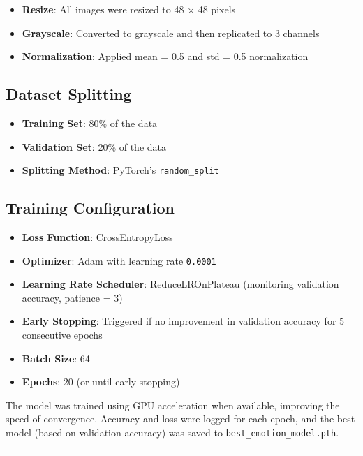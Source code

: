 \documentclass[
  letterpaper,
  DIV=11,
  numbers=noendperiod]{scrreport}
\providecommand{\tightlist}{%
  \setlength{\itemsep}{0pt}\setlength{\parskip}{0pt}}
\begin{document}
\begin{itemize}
\tightlist
\item
  \textbf{Resize}: All images were resized to 48 × 48 pixels
\item
  \textbf{Grayscale}: Converted to grayscale and then replicated to 3
  channels
\item
  \textbf{Normalization}: Applied mean = 0.5 and std = 0.5 normalization
\end{itemize}

\subsection{Dataset Splitting}\label{dataset-splitting}

\begin{itemize}
\tightlist
\item
  \textbf{Training Set}: 80\% of the data
\item
  \textbf{Validation Set}: 20\% of the data
\item
  \textbf{Splitting Method}: PyTorch's \texttt{random\_split}
\end{itemize}

\subsection{Training Configuration}\label{training-configuration}

\begin{itemize}
\tightlist
\item
  \textbf{Loss Function}: CrossEntropyLoss
\item
  \textbf{Optimizer}: Adam with learning rate \texttt{0.0001}
\item
  \textbf{Learning Rate Scheduler}: ReduceLROnPlateau (monitoring
  validation accuracy, patience = 3)
\item
  \textbf{Early Stopping}: Triggered if no improvement in validation
  accuracy for 5 consecutive epochs
\item
  \textbf{Batch Size}: 64
\item
  \textbf{Epochs}: 20 (or until early stopping)
\end{itemize}

The model was trained using GPU acceleration when available, improving
the speed of convergence. Accuracy and loss were logged for each epoch,
and the best model (based on validation accuracy) was saved to
\texttt{best\_emotion\_model.pth}.

\begin{center}\rule{0.5\linewidth}{0.5pt}\end{center}
\end{document}
